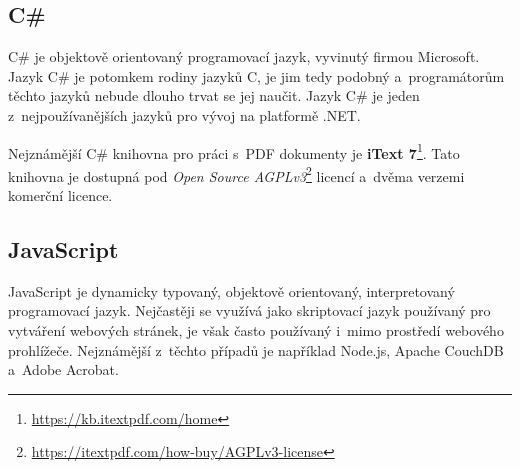 \subsection*{C\#}

C\# je objektově orientovaný programovací jazyk, vyvinutý firmou Microsoft.
Jazyk C\# je potomkem rodiny jazyků C, je jim tedy podobný a~programátorům těchto
jazyků nebude dlouho trvat se jej naučit. Jazyk C\# je jeden z~nejpoužívanějších
jazyků pro vývoj na platformě .NET.
\cite{CSharp}

Nejznámější C\# knihovna pro práci s~PDF dokumenty je \textbf{iText 7}\footnote{
\href{https://kb.itextpdf.com/home}{https://kb.itextpdf.com/home}
}. Tato knihovna je dostupná pod \emph{Open Source AGPLv3}\footnote{
\href{https://itextpdf.com/how-buy/AGPLv3-license}{https://itextpdf.com/how-buy/AGPLv3-license}
} licencí a~dvěma verzemi komerční licence. 

\dummyText


\subsection*{JavaScript}

JavaScript je dynamicky typovaný, objektově orientovaný, interpretovaný
programovací jazyk. Nejčastěji se využívá jako skriptovací jazyk používaný
pro vytváření webových stránek, je však často používaný i~mimo prostředí webového
prohlížeče. Nejznámější z~těchto případů je například Node.js, Apache CouchDB
a~Adobe Acrobat. 
\cite{JavaScript}

